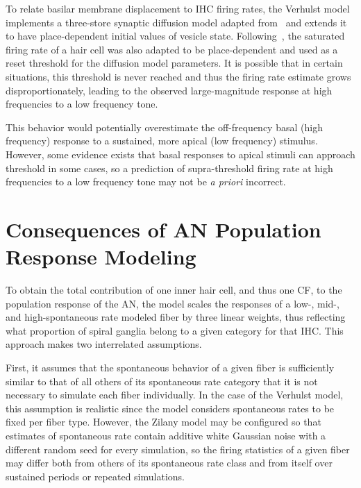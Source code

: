 To relate basilar membrane displacement to IHC firing rates, the Verhulst model implements a three-store synaptic diffusion model adapted from~\cite{Westerman1988Diffusion} and extends it to have place-dependent initial values of vesicle state.   Following~\cite{Liberman1978AuditoryNerve}, the saturated firing rate of a hair cell was also adapted to be place-dependent and used as a reset threshold for the diffusion model parameters.  It is possible that in certain situations, this threshold is never reached and thus the firing rate estimate grows disproportionately, leading to the observed large-magnitude response at high frequencies to a low frequency tone.

This behavior would potentially overestimate the off-frequency basal (high frequency) response to a sustained, more apical (low frequency) stimulus.  However, some evidence exists \citep{Kiang1974Tails,Yates1990Basilar} that basal responses to apical stimuli can approach threshold in some cases, so a prediction of supra-threshold firing rate at high frequencies to a low frequency tone may not be \emph{a priori} incorrect.

\section{Consequences of AN Population Response Modeling} %
\label{sec:consequences_of_percentage_weighting_degradation_for_synaptopathy}
To obtain the total contribution of one inner hair cell, and thus one CF, to the population response of the AN, the model scales the responses of a low-, mid-, and high-spontaneous rate modeled fiber by three linear weights, thus reflecting what proportion of spiral ganglia belong to a given category for that IHC.  This approach makes two interrelated assumptions.  

First, it assumes that the spontaneous behavior of a given fiber is sufficiently similar to that of all others of its spontaneous rate category that it is not necessary to simulate each fiber individually.  In the case of the Verhulst model, this assumption is realistic since the model considers spontaneous rates to be fixed per fiber type.  However, the Zilany model may be configured so that estimates of spontaneous rate contain additive white Gaussian noise with a different random seed for every simulation, so the firing statistics of a given fiber may differ both from others of its spontaneous rate class and from itself over sustained periods or repeated simulations.

